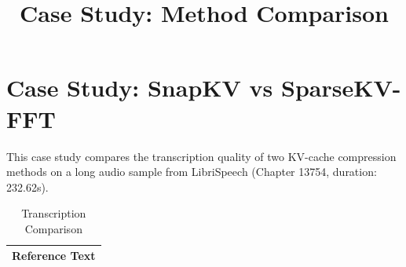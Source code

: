 \documentclass[11pt]{article}
\title{Case Study: Method Comparison}
\author{}
\date{}
\begin{document}
\maketitle

\section*{Case Study: SnapKV vs SparseKV-FFT}

This case study compares the transcription quality of two KV-cache compression methods on a long audio sample from LibriSpeech (Chapter 13754, duration: 232.62s).

\begin{table}[h]
\centering
\caption{Transcription Comparison}
\label{tab:comparison}
\begin{tabularx}{\textwidth}{|X|}
\hline
\rowcolor{refcolor}
\textbf{Reference Text} \\
\hline

\end{tabularx}
\end{table}
\end{document}
